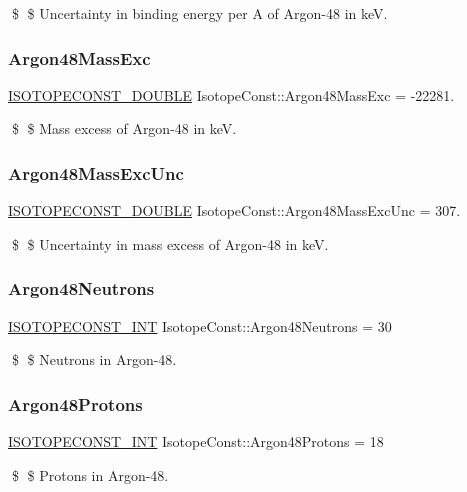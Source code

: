 \$ \$ Uncertainty in binding energy per A of Argon-\/48 in keV. \mbox{\label{group___isotope_const-_argon-_ar48_ga8fa3413c8b3fe44722eef51066379e60}} 
\subsubsection{\texorpdfstring{Argon48\+Mass\+Exc}{Argon48MassExc}}
{\footnotesize\ttfamily \mbox{\hyperlink{group___isotope_const-_macros_ga8f45a7272ce02c0b4c65c44636ed719a}{I\+S\+O\+T\+O\+P\+E\+C\+O\+N\+S\+T\+\_\+\+D\+O\+U\+B\+LE}} Isotope\+Const\+::\+Argon48\+Mass\+Exc = -\/22281.}

\$ \$ Mass excess of Argon-\/48 in keV. \mbox{\label{group___isotope_const-_argon-_ar48_gac31af41a03ff7ecce4bf0e80b9987601}} 
\subsubsection{\texorpdfstring{Argon48\+Mass\+Exc\+Unc}{Argon48MassExcUnc}}
{\footnotesize\ttfamily \mbox{\hyperlink{group___isotope_const-_macros_ga8f45a7272ce02c0b4c65c44636ed719a}{I\+S\+O\+T\+O\+P\+E\+C\+O\+N\+S\+T\+\_\+\+D\+O\+U\+B\+LE}} Isotope\+Const\+::\+Argon48\+Mass\+Exc\+Unc = 307.}

\$ \$ Uncertainty in mass excess of Argon-\/48 in keV. \mbox{\label{group___isotope_const-_argon-_ar48_gad60127c6b7b8150efa4f4d6e5371e982}} 
\subsubsection{\texorpdfstring{Argon48\+Neutrons}{Argon48Neutrons}}
{\footnotesize\ttfamily \mbox{\hyperlink{group___isotope_const-_macros_ga5f18360b3e99483a35c32d789e62621c}{I\+S\+O\+T\+O\+P\+E\+C\+O\+N\+S\+T\+\_\+\+I\+NT}} Isotope\+Const\+::\+Argon48\+Neutrons = 30}

\$ \$ Neutrons in Argon-\/48. \mbox{\label{group___isotope_const-_argon-_ar48_ga970cd0a221ec47e15054ea664ed58d0b}} 
\subsubsection{\texorpdfstring{Argon48\+Protons}{Argon48Protons}}
{\footnotesize\ttfamily \mbox{\hyperlink{group___isotope_const-_macros_ga5f18360b3e99483a35c32d789e62621c}{I\+S\+O\+T\+O\+P\+E\+C\+O\+N\+S\+T\+\_\+\+I\+NT}} Isotope\+Const\+::\+Argon48\+Protons = 18}

\$ \$ Protons in Argon-\/48. 